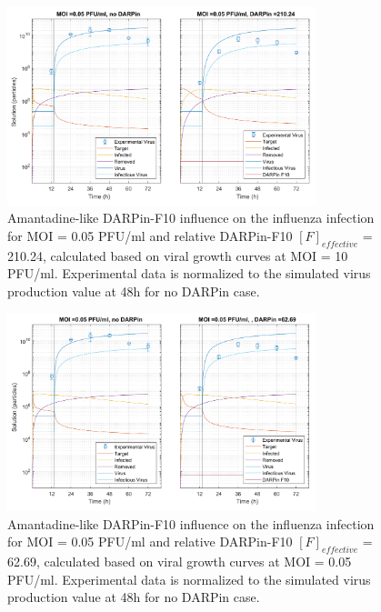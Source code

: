 \begin{figure}
\begin{center}
\includegraphics[width=0.8\textwidth, trim={0cm 0cm 0cm 0cm}, clip]{D_chapters/3_DARPinModels/2_DARPinInfection/comparisonModelTHillIRVViDelayMOI0.072135DARPin210.236AsymmetricDarpinMyosinInhibitor.pdf}
\caption[Amantadine-like DARPin-F10 for MOI = 0.05 PFU/ml and $F_{effective}$ = 210.24]{Amantadine-like DARPin-F10 influence on the influenza infection for MOI = 0.05 PFU/ml and relative DARPin-F10 $[F]_{effective}$ = 210.24, calculated based on viral growth curves at MOI = 10 PFU/ml. Experimental data is normalized to  the simulated virus production value at 48h for no DARPin case.}
\label{figure:amantadineLikeF210}
\end{center}
\end{figure}

\begin{figure}
\begin{center}
\includegraphics[width=0.8\textwidth, trim={0cm 0cm 0cm 0cm}, clip]{D_chapters/3_DARPinModels/2_DARPinInfection/comparisonModelTHillIRVViDelayMOI0.072135DARPin62.6898AsymmetricDarpinMyosinInhibitor.pdf}
\caption[Amantadine-like DARPin-F10 for MOI = 0.05 PFU/ml and $F_{effective}$ = 62.69]{Amantadine-like DARPin-F10 influence on the influenza infection for MOI = 0.05 PFU/ml and relative DARPin-F10 $[F]_{effective}$ = 62.69, calculated based on viral growth curves at MOI = 0.05 PFU/ml. Experimental data is normalized to  the simulated virus production value at 48h for no DARPin case.}
\label{figure:amantadineLikeF62}
\end{center}
\end{figure}

